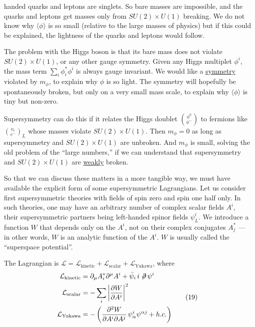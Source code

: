 
handed quarks and leptons are singlets. So bare masses are impossible,
and the quarks and leptons get masses only from $SU(2) \times U(1)$
breaking. We do not know why $\langle \phi \rangle$ is so small (relative to the large
masses of physics) but if this could be explained, the lightness of
the quarks and leptons would follow.

The problem with the Higgs boson is that its bare mass does not
violate $SU(2) \times U(1)$, or any other gauge symmetry. Given any Higgs
multiplet $\phi^i$, the mass term $\sum_i \phi_i^* \phi^i$ is always gauge invariant. We
would like a \underline{symmetry} violated by $m_\phi$, to explain why $\phi$ is so light.
The symmetry will hopefully be spontaneously broken, but only on a
very small mass scale, to explain why $\langle \phi \rangle$ is tiny but non-zero.

Supersymmetry can do this if it relates the Higgs doublet $\binom{\phi^0}{\phi^-}$
to fermions like $\binom{\nu_e}{e^-}_L$ whose masses violate $SU(2) \times U(1)$. Then
$m_\phi = 0$ as long as supersymmetry and $SU(2) \times U(1)$ are unbroken. And
$m_\phi$ is small, solving the old problem of the ``large numbers,'' if we
can understand that supersymmetry and $SU(2) \times U(1)$ are \underline{weakly} broken.

So that we can discuss these matters in a more tangible way,
we must have available the explicit form of some supersymmetric Lagrangians.
Let us consider first supersymmetric theories with fields
of spin zero and spin one half only. In such theories, one may have
an arbitrary number of complex scalar fields $A^i$, their supersymmetric
partners being left-handed spinor fields $\psi_L^i$. We introduce a function
$W$ that depends only on the $A^i$, not on their complex conjugates $A^*_j$ ---
in other words, $W$ is an analytic function of the $A^i$. $W$ is usually
called the ``superspace potential''.

The Lagrangian is $\mathcal{L} = \mathcal{L}_{\mathrm{kinetic}} + \mathcal{L}_{\mathrm{scalar}} + \mathcal{L}_{\mathrm{Yukawa}}$, where
\begin{equation}
\begin{aligned}
\mathcal{L}_{\mathrm{kinetic}} &= \partial_\mu A_i^* \partial^\mu A^i + \bar\psi_i\, i \not\!\partial\, \psi^i \\
\mathcal{L}_{\mathrm{scalar}} &= - \sum_i \left|\frac{\partial W}{\partial A^i}\right|^2 \\
\mathcal{L}_{\mathrm{Yukawa}} &= - \left(\frac{\partial^2 W}{\partial A^i \partial A^j}\, \psi^i_\alpha \psi^{\alpha j} + h.c.\right)
\end{aligned}
\tag{19}
\end{equation}

